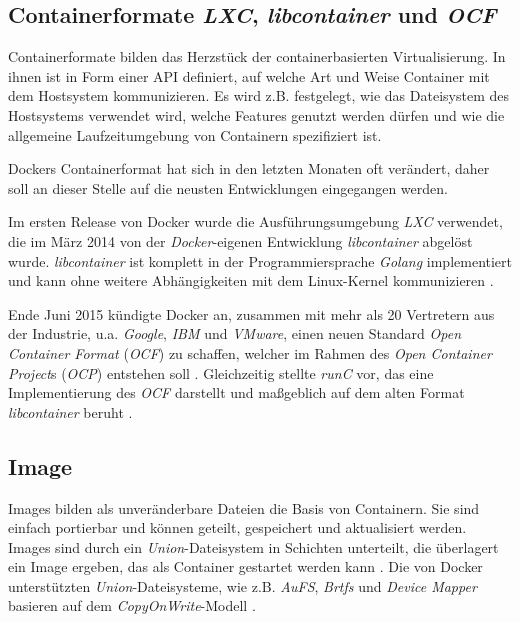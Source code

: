 \documentclass[../main.tex]{subfiles}
\begin{document}
		\subsection{Containerformate \emph{\acrshort{LXC}}, \emph{libcontainer} und \emph{\acrshort{OCF}}}
		\label{dockerContainerformate}
			Containerformate bilden das Herzstück der containerbasierten Virtualisierung. In ihnen ist in Form einer \acrshort{API} definiert, auf welche Art und Weise Container mit dem Hostsystem kommunizieren. Es wird z.B. festgelegt, wie das Dateisystem des Hostsystems verwendet wird, welche Features genutzt werden dürfen und wie die allgemeine Laufzeitumgebung von Containern spezifiziert ist.

			Dockers Containerformat hat sich in den letzten Monaten oft verändert, daher soll an dieser Stelle auf die neusten Entwicklungen eingegangen werden.

			Im ersten Release von Docker wurde die Ausführungsumgebung \emph{LXC} verwendet, die im März 2014 von der \emph{Docker}-eigenen Entwicklung \emph{libcontainer} abgelöst wurde. \emph{libcontainer} ist komplett in der Programmiersprache \emph{Golang} implementiert und kann ohne weitere Abhängigkeiten mit dem Linux-Kernel kommunizieren \cite{dockerLibcontainer}.

			Ende Juni 2015 kündigte Docker an, zusammen mit mehr als 20 Vertretern aus der Industrie, u.a. \emph{Google}, \emph{IBM} und \emph{VMware}, einen neuen Standard \emph{Open Container Format} (\emph{\acrshort{OCF}}) zu schaffen, welcher im Rahmen des \emph{Open Container Project}s (\emph{\acrshort{OCP}}) entstehen soll \cite{dockerOCP}. Gleichzeitig stellte \emph{\acrshort{runC}} vor, das eine Implementierung des \emph{OCF} darstellt und maßgeblich auf dem alten Format \emph{libcontainer} beruht \cite{dockerRunC}\cite{dockerRunCGithub}\cite{runC}.

		\subsection{Image}
    \label{dockerImages}
			Images bilden als unveränderbare Dateien die Basis von Containern. Sie sind einfach portierbar und können geteilt, gespeichert und aktualisiert werden. Images sind durch ein \emph{Union}-Dateisystem in Schichten unterteilt, die überlagert ein Image ergeben, das als Container gestartet werden kann \cite[S.11]{dockerBook}. Die von Docker unterstützten \emph{Union}-Dateisysteme, wie z.B. \emph{AuFS}, \emph{Brtfs} und \emph{Device Mapper} basieren auf dem \emph{\gls{CopyOnWrite}}-Modell \cite[S.8]{dockerBook}\cite[S.3]{dockerIntroIEEE}\cite[S.4]{dockerSecIntro}.
\end{document}
